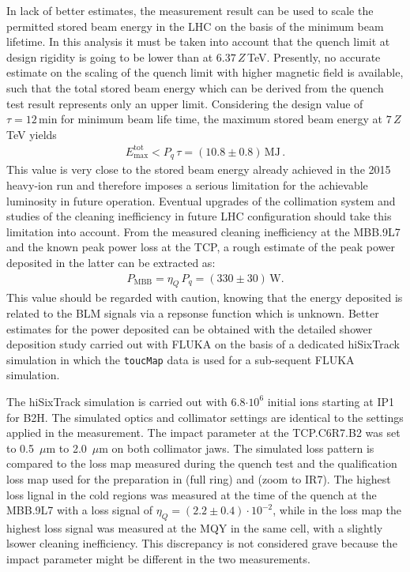 In lack of better estimates, the measurement result can be used to scale the permitted stored beam energy in the LHC on the basis of the minimum beam lifetime. In this analysis it must be taken into account that the quench limit at design rigidity is going to be lower than at $6.37\,Z$\,TeV. Presently, no accurate estimate on the scaling of the quench limit with higher magnetic field is available, such that the total stored beam energy which can be derived from the quench test result represents only an upper limit. Considering the design value of $\tau=12\,\text{min}$ for minimum beam life time, the maximum stored beam energy at $7\,Z\,$TeV yields
%
\begin{align}
  E_\text{max}^\text{tot} < P_q \, \tau = (10.8 \pm 0.8) \, \text{MJ} \, .
\end{align}  
This value is very close to the stored beam energy already achieved in the 2015 heavy-ion run and therefore imposes a serious limitation for the achievable luminosity in future operation. Eventual upgrades of the collimation system and studies of the cleaning inefficiency in future LHC configuration should take this limitation into account. From the measured cleaning inefficiency at the MBB.9L7 and the known peak power loss at the TCP, a rough estimate of the peak power deposited in the latter can be extracted as:
%
\begin{align}
  P_\text{MBB} = \eta_Q \, P_q = (330 \pm 30)\,\text{W}. 
\end{align}
%
This value should be regarded with caution, knowing that the energy deposited is related to the BLM signals via a repsonse function which is unknown. Better estimates for the power deposited can be obtained with the detailed shower deposition study carried out with FLUKA on the basis of a dedicated hiSixTrack simulation in which the \texttt{toucMap} data is used for a sub-sequent FLUKA simulation. 

The hiSixTrack simulation is carried out with 6.8$\cdot 10^6$ initial \lead ions starting at IP1 for B2H. The simulated optics and collimator settings are identical to the settings applied in the measurement. The impact parameter at the TCP.C6R7.B2 was set to 0.5~$\mu$m to 2.0~$\mu$m on both collimator jaws. The simulated loss pattern is compared to the loss map measured during the quench test and the qualification loss map used for the preparation in  (full ring) and  (zoom to IR7). The highest loss lignal in the cold regions was measured at the time of the quench at the MBB.9L7 with a loss signal of $\eta_Q = (2.2 \pm 0.4) \cdot 10^{-2}$, while in the loss map the highest loss signal was measured at the MQY in the same cell, with a slightly lsower cleaning inefficiency. This discrepancy is not considered grave because the impact parameter might be different in the two measurements. 



